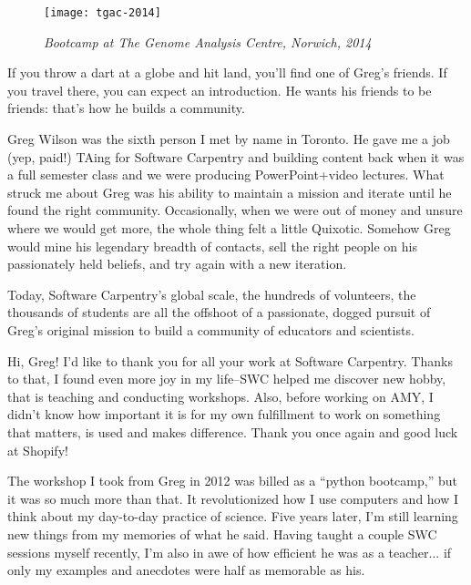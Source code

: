 
\newpage

\begin{figure}[h!]
\begin{center}
\texttt{[image: tgac-2014]}
    \caption*{\textit{Bootcamp at The Genome Analysis Centre, Norwich, 2014}}
\end{center}
\end{figure}

If you throw a dart at a globe and hit land, you'll find one of Greg's friends.
If you travel there, you can expect an introduction. He wants his friends to be
friends: that's how he builds a community.

Greg Wilson was the sixth person I met by name in Toronto. He gave me a job
(yep, paid!) TAing for Software Carpentry and building content back when it was
a full semester class and we were producing PowerPoint+video lectures. What
struck me about Greg was his ability to maintain a mission and iterate until he
found the right community. Occasionally, when we were out of money and unsure
where we would get more, the whole thing felt a little Quixotic. Somehow Greg
would mine his legendary breadth of contacts, sell the right people on his
passionately held beliefs, and try again with a new iteration. 

Today, Software Carpentry's global scale, the hundreds of volunteers, the
thousands of students are all the offshoot of a passionate, dogged pursuit of
Greg's original mission to build a community of educators and scientists.


\newpage

Hi, Greg! I'd like to thank you for all your work at Software Carpentry. Thanks
to that, I found even more joy in my life--SWC helped me discover new hobby,
that is teaching and conducting workshops. Also, before working on AMY, I
didn't know how important it is for my own fulfillment to work on something
that matters, is used and makes difference. Thank you once again and good luck
at Shopify!


\newpage

The workshop I took from Greg in 2012 was billed as a ``python bootcamp,'' but
it was so much more than that.  It revolutionized how I use computers and how I
think about my day-to-day practice of science.  Five years later, I'm still
learning new things from my memories of what he said.  Having taught a couple
SWC sessions myself recently, I'm also in awe of how efficient he was as a
teacher...  if only my examples and anecdotes were half as memorable as his.

